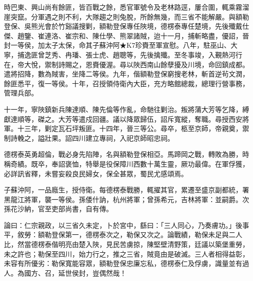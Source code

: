 \begin{pinyinscope}
時巴東、興山尚有餘匪，皆百戰之餘，悉官軍號令及老林路逕，屢合圍，輒乘霧溜崖突竄。分軍遇之則不利，大隊趨之則兔脫，所餘無幾，而三省不能解嚴。與額勒登保、吳熊光會於竹谿議搜剿，額勒登保專任陜境，德楞泰專任楚境，先後殲戴仕傑、趙鑒、崔連洛、崔宗和、陳仕學、熊翠諸賊，迨十一月，捕斬略盡，優詔，晉封一等侯，加太子太保，命其子蘇沖阿★K7珍賚至軍宣慰。八年，駐巫山、大寧，捕逸匪曾芝秀、冉璠、張士虎、趙聰等，先後擒殲。至冬事竣，入覲熱河行在，帝大悅，禦制詩賜之，恩賚優渥。尋以陜西南山餘孽擾及川境，命回鎮成都。遣將招降，數為賊害，坐降二等侯。九年，偕額勒登保窮搜老林，斬首逆茍文潤，餘匪悉平，復一等侯。十年，召授領侍衛內大臣，充方略館總裁，總理行營事務，管理兵部。

十一年，寧陜鎮新兵陳達順、陳先倫等作亂，命馳往剿治。叛將蒲大芳等乞降，縛獻達順等，磔之。大芳等遣戍回疆。議以降眾歸伍，詔斥寬縱，奪職。尋授西安將軍。十三年，剿定瓦石坪叛匪。十四年，晉三等公。尋卒，柩至京師，帝親奠，禦制詩輓之，謚壯果。詔四川建立專祠，入祀京師昭忠祠。

德楞泰英勇超倫，戰必身先陷陣，名與額勒登保相亞。馬蹄岡之戰，轉敗為勝，時稱奇績。既卒，奉詔褒恤，特舉是役保障川西數十萬生靈，厥功最偉。在軍俘獲，必詳訊省釋，未嘗妄殺良民婦女，保全甚眾，蜀民尤感頌焉。

子蘇沖阿，一品廕生，授侍衛。每德楞泰戰勝，輒擢其官，累遷至盛京副都統，署黑龍江將軍，襲一等侯。孫倭什訥，杭州將軍；曾孫希元，吉林將軍：並嗣爵。次孫花沙納，官至吏部尚書，自有傳。

論曰：仁宗親政，以三省久未定，卜於宮中，繇曰：「三人同心，乃奏膚功。」後事平，敘勞：額勒登保第一，德楞泰次之，勒保又次之。論戰績，勒保未足與二人比，然當德楞泰偕明亮由楚入陜，見民苦虜掠，陳堅壁清野策，廷議以築堡重勞，未之許也；勒保至四川，始力行之，推之三省，賊竟由是破滅。三人者相得益彰，未容有所優劣：勒保寬能容眾，額勒登保忠廉忘私，德楞泰仁及俘虜，識量並有過人。為國方、召，延世侯封，豈偶然哉！


\end{pinyinscope}